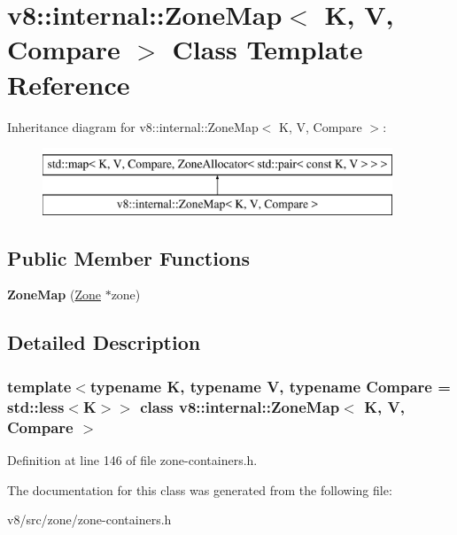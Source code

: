 \hypertarget{classv8_1_1internal_1_1ZoneMap}{}\section{v8\+:\+:internal\+:\+:Zone\+Map$<$ K, V, Compare $>$ Class Template Reference}
\label{classv8_1_1internal_1_1ZoneMap}
Inheritance diagram for v8\+:\+:internal\+:\+:Zone\+Map$<$ K, V, Compare $>$\+:\begin{figure}[H]
\begin{center}
\leavevmode
\includegraphics[height=2.000000cm]{classv8_1_1internal_1_1ZoneMap}
\end{center}
\end{figure}
\subsection*{Public Member Functions}
\begin{DoxyCompactItemize}
\item 
\mbox{\label{classv8_1_1internal_1_1ZoneMap_ae0cc3bdb7c66e2ae32977fb0bdfebaf8}} 
{\bfseries Zone\+Map} (\mbox{\hyperlink{classv8_1_1internal_1_1Zone}{Zone}} $\ast$zone)
\end{DoxyCompactItemize}


\subsection{Detailed Description}
\subsubsection*{template$<$typename K, typename V, typename Compare = std\+::less$<$\+K$>$$>$\newline
class v8\+::internal\+::\+Zone\+Map$<$ K, V, Compare $>$}



Definition at line 146 of file zone-\/containers.\+h.



The documentation for this class was generated from the following file\+:\begin{DoxyCompactItemize}
\item 
v8/src/zone/zone-\/containers.\+h\end{DoxyCompactItemize}

